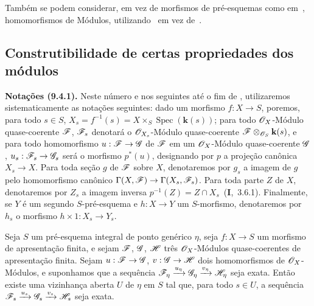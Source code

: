 Também se podem considerar, em vez de morfismos de pré-esquemas como em~, homomorfismos de Módulos, utilizando~ em vez de~.


\subsection{Construtibilidade de certas propriedades dos módulos}
\label{subsection:IV.9.4}

\begin{env}[9.4.1]
\label{IV.9.4.1}
\textbf{Notações (9.4.1).}
Neste número e nos seguintes até o fim de , utilizaremos sistematicamente as notações seguintes: dado um morfismo $f:X\to S$, poremos, para todo $s\in S$, $X_s=f^{-1}(s)=X\times_S\operatorname{Spec}(\mathbf{k}(s))$; para todo $\mathscr{O}_X$-Módulo quase-coerente $\mathscr{F}$, $\mathscr{F}_s$ denotará o $\mathscr{O}_{X_s}$-Módulo quase-coerente $\mathscr{F}\otimes_{\mathscr{O}_S}\mathbf{k}(s)$, e para todo homomorfismo $u:\sh{F}\to\sh{G}$ de $\mathscr{F}$ em um $\mathscr{O}_X$-Módulo quase-coerente $\mathscr{G}$, $u_s:\sh{F}_s\to\sh{G}_s$ será o morfismo $p^*(u)$, designando por $p$ a projeção canônica $X_s\to X$.
Para toda seção $g$ de $\mathscr{F}$ sobre $X$, denotaremos por $g_s$ a imagem de $g$ pelo homomorfismo canônico $\Gamma(X,\sh{F})\to\Gamma(X_s,\sh{F}_s)$.
Para toda parte $Z$ de $X$, denotaremos por $Z_s$ a imagem inversa $p^{-1}(Z)=Z\cap X_s$~(\textbf{I},~3.6.1).
Finalmente, se $Y$ é um segundo $S$-pré-esquema e $h:X\to Y$ um $S$-morfismo, denotaremos por $h_s$ o morfismo $h\times 1:X_s\to Y_s$.
\end{env}

\begin{proposition}[9.4.2]
\label{IV.9.4.2}
Seja $S$ um pré-esquema integral de ponto genérico $\eta$, seja $f:X\to S$ um morfismo de apresentação finita, e sejam $\mathscr{F}$, $\mathscr{G}$, $\mathscr{H}$ três $\mathscr{O}_X$-Módulos quase-coerentes de apresentação finita.
Sejam $u:\sh{F}\to\sh{G}$, $v:\sh{G}\to\sh{H}$ dois homomorfismos de $\mathscr{O}_X$-Módulos, e suponhamos que a sequência $\mathscr{F}_\eta\xrightarrow{u_\eta}\mathscr{G}_\eta\xrightarrow{v_\eta}\mathscr{H}_\eta$ seja exata.
Então existe uma vizinhança aberta $U$ de $\eta$ em $S$ tal que, para todo $s\in U$, a sequência $\mathscr{F}_s\xrightarrow{u_s}\mathscr{G}_s\xrightarrow{v_s}\mathscr{H}_s$ seja exata.
\end{proposition}

